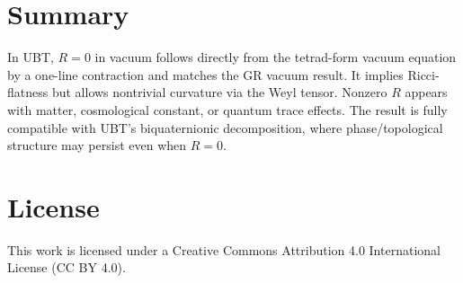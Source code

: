 \documentclass[12pt]{article}
\begin{document}
\section{Summary}
In UBT, $R=0$ in vacuum follows directly from the tetrad-form vacuum equation by a one-line contraction and matches the GR vacuum result. It implies Ricci-flatness but allows nontrivial curvature via the Weyl tensor. Nonzero $R$ appears with matter, cosmological constant, or quantum trace effects. The result is fully compatible with UBT's biquaternionic decomposition, where phase/topological structure may persist even when $R=0$.


\section*{License}
This work is licensed under a Creative Commons Attribution 4.0 International License (CC BY 4.0).
\end{document}
